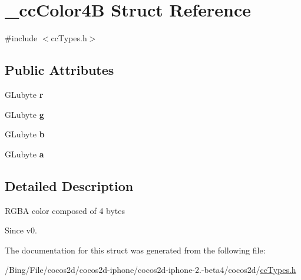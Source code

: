 \hypertarget{struct__cc_color4_b}{\section{\-\_\-cc\-Color4\-B Struct Reference}
\label{struct__cc_color4_b}
}


{\ttfamily \#include $<$cc\-Types.\-h$>$}

\subsection*{Public Attributes}
\begin{DoxyCompactItemize}
\item 
\hypertarget{struct__cc_color4_b_ab1f567e15b6b3d83bd9f9b301895b66f}{G\-Lubyte {\bfseries r}}\label{struct__cc_color4_b_ab1f567e15b6b3d83bd9f9b301895b66f}

\item 
\hypertarget{struct__cc_color4_b_a3718941577c792feea5938dde5666d82}{G\-Lubyte {\bfseries g}}\label{struct__cc_color4_b_a3718941577c792feea5938dde5666d82}

\item 
\hypertarget{struct__cc_color4_b_abf402ebba867a4f3eaeeb9fc0fc7793c}{G\-Lubyte {\bfseries b}}\label{struct__cc_color4_b_abf402ebba867a4f3eaeeb9fc0fc7793c}

\item 
\hypertarget{struct__cc_color4_b_a651f023c5bf127ee102c5845d9e7f802}{G\-Lubyte {\bfseries a}}\label{struct__cc_color4_b_a651f023c5bf127ee102c5845d9e7f802}

\end{DoxyCompactItemize}


\subsection{Detailed Description}
R\-G\-B\-A color composed of 4 bytes \begin{DoxySince}{Since}
v0. 
\end{DoxySince}


The documentation for this struct was generated from the following file\-:\begin{DoxyCompactItemize}
\item 
/\-Bing/\-File/cocos2d/cocos2d-\/iphone/cocos2d-\/iphone-\/2.-\/beta4/cocos2d/\hyperlink{cc_types_8h}{cc\-Types.\-h}\end{DoxyCompactItemize}

